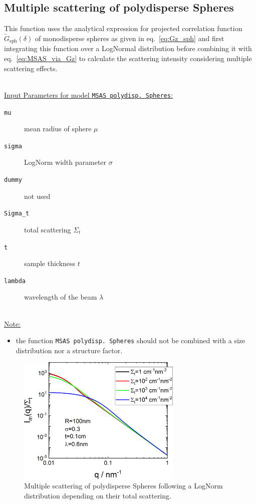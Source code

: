 \newpage
\subsection{Multiple scattering of polydisperse Spheres}

This function uses the analytical expression for projected correlation function $\tilde{G}_\mathrm{sph}(\delta)$ of monodisperse spheres as given in eq.\ \ref{eq:Gz_sph} and first integrating this function over a LogNormal distribution before combining it with eq.\ \ref{eq:MSAS_via_Gz} to calculate the scattering intensity considering multiple scattering effects.

\hspace{1pt}\\
\uline{Input Parameters for model \texttt{MSAS polydisp. Spheres}:}\\
\begin{description}
\item[\texttt{mu}] mean radius of sphere $\mu$
\item[\texttt{sigma}] LogNorm width parameter $\sigma$
\item[\texttt{dummy}] not used
\item[\texttt{Sigma\_t}] total scattering $\Sigma_t$
\item[\texttt{t}] sample thickness $t$
\item[\texttt{lambda}] wavelength of the beam $\lambda$
\end{description}

\hspace{1pt}\\
\uline{Note:}
\begin{itemize}
\item the function \texttt{MSAS polydisp. Spheres} should not be combined with a size distribution nor a structure factor.
\end{itemize}

\begin{figure}[htb]
\begin{center}
\includegraphics[width=0.7\textwidth]{../images/form_factor/MSAS/MSAS_polydispSpheres.png}
\end{center}
\caption{Multiple scattering of polydisperse Spheres following a LogNorm distribution depending on their total scattering.}
\label{fig:MSAS_polySpheres}
\end{figure}

